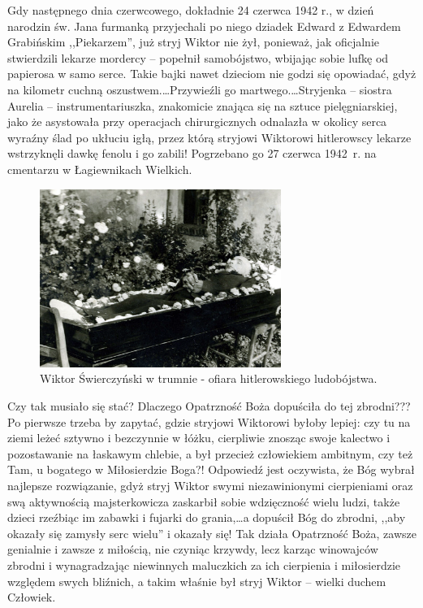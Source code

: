 Gdy następnego dnia czerwcowego, dokładnie 24 czerwca 1942 r., w dzień narodzin św. Jana furmanką przyjechali po niego dziadek Edward z Edwardem Grabińskim ,,Piekarzem'', już stryj Wiktor nie żył, ponieważ, jak oficjalnie stwierdzili lekarze mordercy -- popełnił samobójstwo, wbijając sobie lufkę od papierosa w samo serce. Takie bajki nawet dzieciom nie godzi się opowiadać, gdyż na kilometr cuchną oszustwem.\ldots Przywieźli go martwego.\ldots Stryjenka -- siostra Aurelia -- instrumentariuszka, znakomicie znająca się na sztuce pielęgniarskiej, jako że asystowała przy operacjach chirurgicznych odnalazła w okolicy serca wyraźny ślad po ukłuciu igłą, przez którą stryjowi Wiktorowi hitlerowscy lekarze wstrzyknęli dawkę fenolu i go zabili! Pogrzebano go 27 czerwca 1942~r. na cmentarzu w Łagiewnikach Wielkich.

\begin{figure}[!h]
\begin{center}
\includegraphics[width=0.7\textwidth]{photo/wiktor_swierczynski_pogrzeb.jpg}
\caption[Wiktor Świerczyński w trumnie]{Wiktor Świerczyński w trumnie - ofiara hitlerowskiego ludobójstwa.}
\label{rys:wiktor_swierczynski_pogrzeb}
\end{center}
\end{figure}

Czy tak musiało się stać? Dlaczego Opatrzność Boża dopuściła do tej zbrodni??? Po pierwsze trzeba by zapytać, gdzie stryjowi Wiktorowi byłoby lepiej: czy tu na ziemi leżeć sztywno i bezczynnie w łóżku, cierpliwie znosząc swoje kalectwo i pozostawanie na łaskawym chlebie, a był przecież człowiekiem ambitnym, czy też Tam, u bogatego w Miłosierdzie Boga?! Odpowiedź jest oczywista, że Bóg wybrał najlepsze rozwiązanie, gdyż stryj  Wiktor swymi niezawinionymi cierpieniami oraz swą aktywnością majsterkowicza zaskarbił sobie wdzięczność wielu ludzi, także dzieci rzeźbiąc im zabawki i fujarki do grania,\ldots a dopuścił Bóg do zbrodni, ,,aby okazały się zamysły serc wielu'' i okazały się! Tak działa Opatrzność Boża, zawsze genialnie i zawsze z miłością, nie czyniąc krzywdy, lecz karząc winowajców zbrodni i wynagradzając niewinnych maluczkich za ich cierpienia i miłosierdzie względem swych bliźnich, a takim właśnie był stryj Wiktor -- wielki duchem Człowiek.